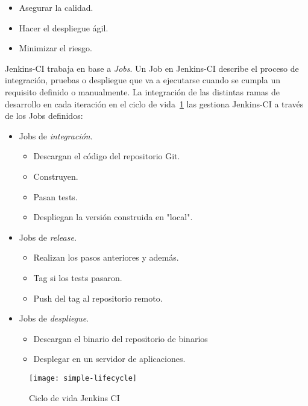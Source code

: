 \begin{itemize}
	\item Asegurar la calidad.
	\item Hacer el despliegue ágil.
	\item Minimizar el riesgo.
\end{itemize}

\par Jenkins-CI trabaja en base a \emph{Jobs}. Un Job en Jenkins-CI describe el proceso de integración, pruebas o despliegue que va a ejecutarse cuando se cumpla un requisito definido o manualmente. La integración de las distintas ramas de desarrollo en cada iteración en el ciclo de vida~\ref{fig:simple-lifecycle} las gestiona Jenkins-CI a través de los Jobs definidos:

\begin{itemize}
	\item Jobs de \emph{integración}.
	    \begin{itemize}
        	\item Descargan el código del repositorio Git.
        	\item Construyen.
        	\item Pasan tests.
        	\item Despliegan la versión construida en "local".
        \end{itemize}
	\item Jobs de \emph{release}.
	    \begin{itemize}
        	\item Realizan los pasos anteriores y además.
        	\item Tag si los tests pasaron.
        	\item Push del tag al repositorio remoto.
        \end{itemize}
	\item Jobs de \emph{despliegue}.
	    \begin{itemize}
        	\item Descargan el binario del repositorio de binarios
        	\item Desplegar en un servidor de aplicaciones.
        \end{itemize}
\end{itemize}

\begin{figure}[H]
    \centering
    \texttt{[image: simple-lifecycle]}
    \caption{Ciclo de vida Jenkins CI}
    \label{fig:simple-lifecycle}
\end{figure}

